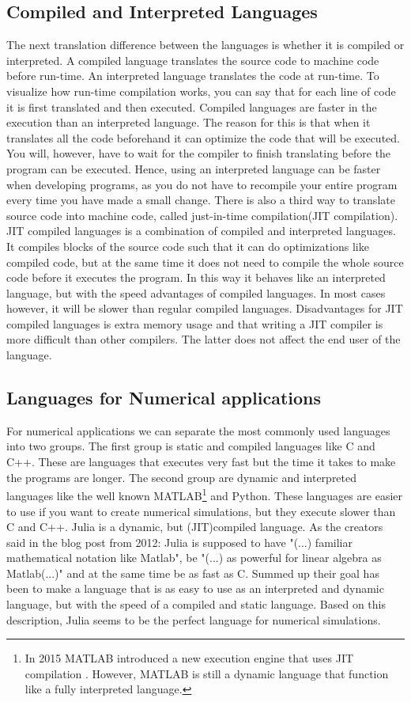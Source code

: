 \subsection{Compiled and Interpreted Languages}
The next translation difference between the languages is whether it is compiled or interpreted. A compiled language translates the source code to machine code before run-time. An interpreted language translates the code at run-time. To visualize how run-time compilation works, you can say that for each line of code it is first translated and then executed. Compiled languages are faster in the execution than an interpreted language. The reason for this is that when it translates all the code beforehand it can optimize the code that will be executed. You will, however, have to wait for the compiler to finish translating before the program can be executed. Hence, using an interpreted language can be faster when developing programs, as you do not have to recompile your entire program every time you have made a small change. There is also a third way to translate source code into machine code, called just-in-time compilation(JIT compilation). JIT compiled languages is a combination of compiled and interpreted languages. It compiles blocks of the source code such that it can do optimizations like compiled code, but at the same time it does not need to compile the whole source code before it executes the program. In this way it behaves like an interpreted language, but with the speed advantages of compiled languages. In most cases however, it will be slower than regular compiled languages. Disadvantages for JIT compiled languages is extra memory usage and that writing a JIT compiler is more difficult than other compilers. The latter does not affect the end user of the language.

\subsection{Languages for Numerical applications}
For numerical applications we can separate the most commonly used languages into two groups. The first group is static and compiled languages like C and C++. These are languages that executes very fast but the time it takes to make the programs are longer. The second group are dynamic and interpreted languages like the well known MATLAB\footnote{In 2015 MATLAB introduced a new execution engine that uses JIT compilation \emph{\citep{MatlabJIT}}. However, MATLAB is still a dynamic language that function like a fully interpreted language.} and Python. These languages are easier to use if you want to create numerical simulations, but they execute slower than C and C++. Julia is a dynamic, but (JIT)compiled language. As the creators said in the blog post from 2012: Julia is supposed to have "(...) familiar mathematical notation like Matlab", be "(...) as  powerful  for  linear  algebra  as Matlab(...)" and at the same time be as fast as C. Summed up their goal has been to make a language that is as easy to use as an interpreted and dynamic language, but with the speed of a compiled and static language. Based on this description, Julia seems to be the perfect language for numerical simulations.


